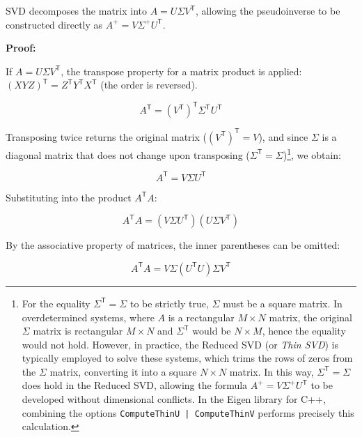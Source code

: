 \documentclass[11pt,a4paper]{article}
\newcommand{\trans}{\mathsf{T}}      %
\begin{document}
SVD decomposes the matrix into \(A = U \Sigma V^{\trans}\), allowing the pseudoinverse to be constructed directly as \(A^+ = V \Sigma^+ U^{\trans}\).

\textbf{Proof:}

If \(A = U \Sigma V^{\trans}\), the transpose property for a matrix product is applied: \((X Y Z)^{\trans} = Z^{\trans} Y^{\trans} X^{\trans}\) (the order is reversed).

\begin{equation}
    A^{\trans} = (V^{\trans})^{\trans} \Sigma^{\trans} U^{\trans}
\end{equation}

Transposing twice returns the original matrix (\((V^{\trans})^{\trans} = V\)), and since \(\Sigma\) is a diagonal matrix that does not change upon transposing (\(\Sigma^{\trans} = \Sigma\))\footnote{For the equality \(\Sigma^{\trans} = \Sigma\) to be strictly true, \(\Sigma\) must be a square matrix. In overdetermined systems, where \(A\) is a rectangular \(M \times N\) matrix, the original \(\Sigma\) matrix is rectangular \(M \times N\) and \(\Sigma^{\trans}\) would be \(N \times M\), hence the equality would not hold. However, in practice, the Reduced SVD (or \textit{Thin SVD}) is typically employed to solve these systems, which trims the rows of zeros from the \(\Sigma\) matrix, converting it into a square \(N \times N\) matrix. In this way, \(\Sigma^{\trans} = \Sigma\) does hold in the Reduced SVD, allowing the formula \(A^+ = V \Sigma^+ U^{\trans}\) to be developed without dimensional conflicts. In the Eigen library for C++, combining the options \texttt{ComputeThinU | ComputeThinV} performs precisely this calculation.}, we obtain:

\begin{equation}
    A^{\trans} = V \Sigma U^{\trans}
\end{equation}

Substituting into the product \(A^{\trans} A\):

\begin{equation}
    A^{\trans} A = (V \Sigma U^{\trans}) (U \Sigma V^{\trans})
\end{equation}

By the associative property of matrices, the inner parentheses can be omitted:

\begin{equation}
    A^{\trans} A = V \Sigma (U^{\trans} U) \Sigma V^{\trans}
\end{equation}
\end{document}
